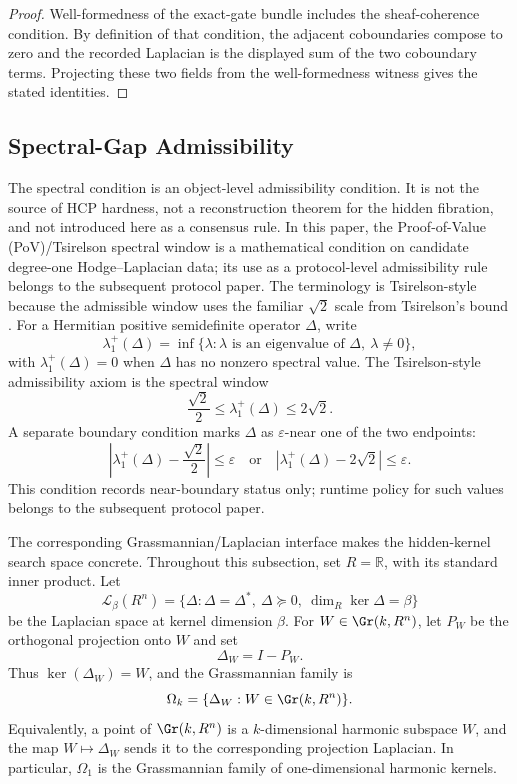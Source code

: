 \begin{proof}
  Well-formedness of the exact-gate bundle includes the sheaf-coherence
  condition. By definition of that condition, the adjacent coboundaries
  compose to zero and the recorded Laplacian is the displayed sum of the two
  coboundary terms. Projecting these two fields from the well-formedness
  witness gives the stated identities.
\end{proof}

\subsection{Spectral-Gap Admissibility}

The spectral condition is an object-level admissibility condition. It is not the
source of HCP hardness, not a reconstruction theorem for the hidden fibration,
and not introduced here as a consensus rule. In this paper, the
Proof-of-Value (PoV)/Tsirelson
spectral window is a mathematical condition on candidate
degree-one Hodge--Laplacian data; its use as a protocol-level admissibility rule belongs to
the subsequent protocol paper. The terminology is
Tsirelson-style because the admissible window uses the familiar \(\sqrt 2\)
scale from Tsirelson's bound \cite{tsirelson1980bell}. For a Hermitian
positive semidefinite operator \(\Delta\), write
\[
  \lambda_1^+(\Delta)
  =
  \inf\{\lambda:\lambda\text{ is an eigenvalue of }\Delta,\ \lambda\ne 0\},
\]
with \(\lambda_1^+(\Delta)=0\) when \(\Delta\) has no nonzero spectral value.
The Tsirelson-style admissibility axiom is the spectral window
\[
  \frac{\sqrt{2}}{2}
  \le
  \lambda_1^+(\Delta)
  \le
  2\sqrt{2}.
\]
A separate boundary condition marks \(\Delta\) as \(\varepsilon\)-near one of
the two endpoints:
\[
  \left|\lambda_1^+(\Delta)-\frac{\sqrt 2}{2}\right|\le \varepsilon
  \quad\text{or}\quad
  \left|\lambda_1^+(\Delta)-2\sqrt 2\right|\le \varepsilon .
\]
This condition records near-boundary status only; runtime policy for such values
belongs to the subsequent protocol paper.

The corresponding Grassmannian/Laplacian interface makes the hidden-kernel
search space concrete. Throughout this subsection, set \(R=\mathbb R\), with its
standard inner product. Let
\[
  \mathcal L_\beta(R^n)
  =
  \{\Delta:\Delta=\Delta^\ast,\ \Delta\succeq 0,\ \dim_R\ker\Delta=\beta\}
\]
be the Laplacian space at kernel dimension \(\beta\). For
\(W\in\Gr(k,R^n)\), let \(P_W\) be the orthogonal projection onto \(W\) and set
\[
  \Delta_W = I-P_W .
\]
Thus \(\ker(\Delta_W)=W\), and the Grassmannian family is
\[
  \Omega_k
  =
  \{\Delta_W:W\in\Gr(k,R^n)\}.
\]
Equivalently, a point of \(\Gr(k,R^n)\) is a \(k\)-dimensional harmonic
subspace \(W\), and the map \(W\mapsto\Delta_W\) sends it to the corresponding
projection Laplacian. In particular, \(\Omega_1\) is the Grassmannian family
of one-dimensional harmonic kernels.

